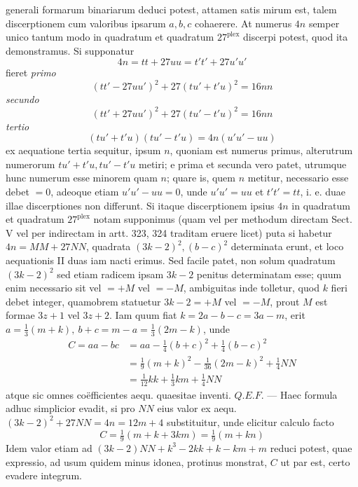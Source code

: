 generali formarum binariarum deduci potest, attamen satis mirum est, talem discerptionem cum valoribus ipsarum \(a,\allowbreak b,\allowbreak c\) cohaerere. At numerus \(4n\) semper unico tantum modo in quadratum et quadratum \(27^{\mathrm{plex}}\) discerpi potest, quod ita demonstramus. Si supponatur \[4n=tt+27uu=t't'+27u'u'\] fieret \textit{primo} \[(tt'-27uu')^2+27(tu'+t'u)^2=16nn\] \textit{secundo} \[(tt'+27uu')^2+27(tu'-t'u)^2=16nn\] \textit{tertio} \[(tu'+t'u)(tu'-t'u)=4n(u'u'-uu)\] ex aequatione tertia sequitur, ipsum \(n\), quoniam est numerus primus, alterutrum numerorum \(tu'+t'u,\allowbreak tu'-t'u\) metiri; e prima et secunda vero patet, utrumque hunc numerum esse minorem quam \(n\); quare is, quem \(n\) metitur, necessario esse debet \(=0\), adeoque etiam \(u'u'-uu=0\), unde \(u'u'=uu\) et \(t't'=tt\), i. e. duae illae discerptiones non differunt. Si itaque discerptionem ipsius \(4n\) in quadratum et quadratum \(27^{\mathrm{plex}}\) notam supponimus (quam vel per methodum directam Sect. V vel per indirectam in artt. 323, 324 traditam eruere licet) puta si habetur \(4n=MM+27NN\), quadrata \((3k-2)^2,\allowbreak (b-c)^2\) determinata erunt, et loco aequationis II duas iam nacti erimus. Sed facile patet, non solum quadratum \((3k-2)^2\) sed etiam radicem ipsam \(3k-2\) penitus determinatam esse; quum enim necessario sit vel \(=+M\) vel \(=-M\), ambiguitas inde tolletur, quod \(k\) fieri debet integer, quamobrem statuetur \(3k-2=+M\) vel \(=-M\), prout \(M\) est formae \(3z+1\) vel \(3z+2\). Iam quum fiat \(k=2a-b-c=3a-m\), erit \(a=\frac13(m+k),\allowbreak \ b+c=m-a=\frac13(2m-k)\), unde \[\begin{aligned}C=aa-bc&=aa-\tfrac14(b+c)^2+\tfrac14(b-c)^2\\&=\tfrac19(m+k)^2-\tfrac1{36}(2m-k)^2+\tfrac14NN\\&=\tfrac1{12}kk+\tfrac13km+\tfrac14NN\end{aligned}\] atque sic omnes coëfficientes aequ. quaesitae inventi. \(Q.E.F.\) — Haec formula
adhuc simplicior evadit, si pro \(NN\) eius valor ex aequ. \((3k-2)^2+27NN=4n=12m+4\) substituitur, unde elicitur calculo facto \[C=\tfrac19(m+k+3km)=\tfrac19(m+kn)\] Idem valor etiam ad \((3k-2)NN+k^3-2kk+k-km+m\) reduci potest, quae expressio, ad usum quidem minus idonea, protinus monstrat, \(C\) ut par est, certo evadere integrum.

